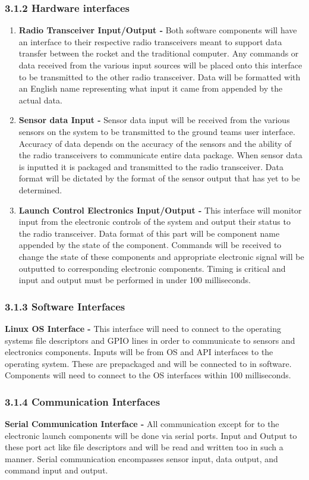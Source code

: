 \documentclass[10pt,draftclsnofoot,onecolumn]{IEEEtran}
\begin{document}
\subsubsection{3.1.2 Hardware interfaces }
\begin{enumerate}
\item {\bf Radio Transceiver Input/Output -}
		Both software components will have an interface to their respective radio transceivers meant to support data transfer between the rocket and the traditional computer. Any commands or data received from the various input sources will be placed onto this interface to be transmitted to the other radio transceiver. Data will be formatted with an English name representing what input it came from appended by the actual data.
\item {\bf Sensor data Input -}
Sensor data input will be received from the various sensors on the system to be transmitted to the ground teams user interface. Accuracy of data depends on the accuracy of the sensors and the ability of the radio transceivers to communicate entire data package. When sensor data is inputted it is packaged and transmitted to the radio transceiver. Data format will be dictated by the format of the sensor output that has yet to be determined.
\item {\bf Launch Control Electronics Input/Output -}
This interface will monitor input from the electronic controls of the system and output their status to the radio transceiver. Data format of this part will be component name appended by the state of the component. Commands will be received to change the state of these components and appropriate electronic signal will be outputted to corresponding electronic components. Timing is critical and input and output must be performed in under 100 milliseconds.
\end{enumerate}

\subsubsection{3.1.3 Software Interfaces}
{\bf Linux OS Interface -} This interface will need to connect to the operating systems file descriptors and GPIO lines in order to communicate to sensors and electronics components. Inputs will be from OS and API interfaces to the operating system. These are prepackaged and will be connected to in software. Components will need to connect to the OS interfaces within 100 milliseconds. 

\subsubsection{3.1.4 Communication Interfaces}
{\bf Serial Communication Interface -} All communication except for to the electronic launch components will be done via serial ports. Input and Output to these port act like file descriptors and will be read and written too in such a manner. Serial communication encompasses sensor input, data output, and command input and output.
\end{document}
